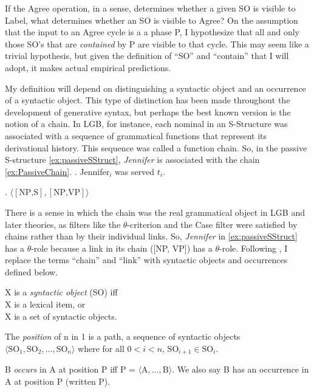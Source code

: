 \documentclass[MilwayThesis]{subfiles}
\begin{document}
If the Agree operation, in a sense, determines whether a given SO is visible to Label, what determines whether an SO is visible to Agree?
On the assumption that the input to an Agree cycle is a a phase P, I hypothesize that all and only those SO's that are \textit{contained} by P are visible to that cycle.
This may seem like a trivial hypothesis, but given the definition of ``SO'' and ``contain'' that I will adopt, it makes actual empirical predictions.

My definition will depend on distinguishing a syntactic object and an occurrence of a syntactic object.
This type of distinction has been made throughout the development of generative syntax, but perhaps the best known version is the notion of a chain.
In LGB, for instance, each nominal in an S-Structure was associated with a sequence of grammatical functions that represent its derivational history.
This sequence was called a function chain.
So, in the passive S-structure \cref{ex:passiveSStruct}, \textit{Jennifer} is associated with the chain \cref{ex:PassiveChain}.
\ex.\label{ex:passiveSStruct} Jennifer$_i$ was served $t_i$.

\ex.\label{ex:PassiveChain} $\langle\left[\text{NP,S}\right], \left[\text{NP,VP}\right]\rangle$

There is a sense in which the chain was the real grammatical object in LGB and later theories, as filters like the $\theta$-criterion and the Case filter were satisfied by chains rather than by their individual links.
So, \textit{Jennifer} in \cref{ex:passiveSStruct} has a $\theta$-role because a link in its chain ([NP, VP]) has a $\theta$-role.
Following \textcite{collins2016formalization}, I replace the terms ``chain'' and ``link'' with syntactic objects and occurrences defined below.
\begin{defn}
  X is a \textit{syntactic object} (SO) iff\\
    X is a lexical item, or\\
    X is a set of syntactic objects. \parencite[Modified from][]{collins2016formalization}
  \label{def:so}
\end{defn}
\begin{defn}[Position]
  The \textit{position} of n in 1 is a path, a sequence of syntactic objects $\langle\text{SO}_1,\text{SO}_2,\dots,\text{SO}_n\rangle$ where for all $0 < i < n$, $\text{SO}_{i + 1} \in \text{SO}_i$. \parencite{collins2016formalization}
  \label{def:position}
\end{defn}
\begin{defn}[Occurrence]
  B \textit{occurs} in A at position P iff P = $\langle\text{A},\dots,\text{B}\rangle$. We also say B has an occurrence in A at position P (written P).
  \label{def:occurrence}
\end{defn}
\end{document}
